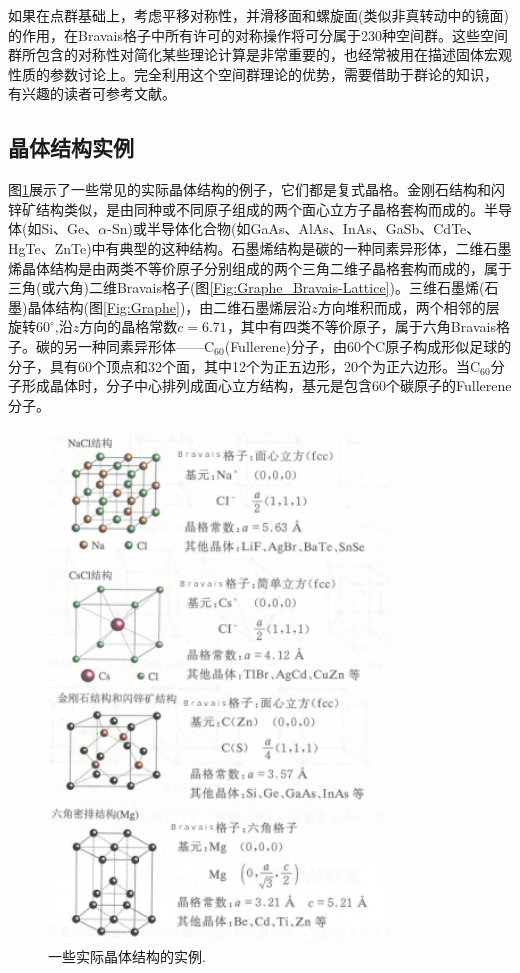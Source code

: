 如果在点群基础上，考虑平移对称性，并滑移面和螺旋面(类似非真转动中的镜面)的作用，在Bravais格子中所有许可的对称操作将可分属于230种空间群。这些空间群所包含的对称性对简化某些理论计算是非常重要的，也经常被用在描述固体宏观性质的参数讨论上。完全利用这个空间群理论的优势，需要借助于群论的知识，%
有兴趣的读者可参考文献。

\subsection{晶体结构实例}
图\ref{Fig:Crystal-structure-example}展示了一些常见的实际晶体结构的例子，它们都是复式晶格。金刚石结构和闪锌矿结构类似，是由同种或不同原子组成的两个面心立方子晶格套构而成的。半导体(如Si、Ge、$\alpha$-Sn)或半导体化合物(如GaAs、AlAs、InAs、GaSb、CdTe、HgTe、ZnTe)中有典型的这种结构。石墨烯结构是碳的一种同素异形体，二维石墨烯晶体结构是由两类不等价原子分别组成的两个三角二维子晶格套构而成的，属于三角(或六角)二维Bravais格子(图\ref{Fig:Graphe_Bravais-Lattice})。三维石墨烯(石墨)晶体结构(图\ref{Fig:Graphe})，由二维石墨烯层沿$z$方向堆积而成，两个相邻的层旋转$60^{\circ}$,沿$z$方向的晶格常数$c=6.71$，其中有四类不等价原子，属于六角Bravais格子。碳的另一种同素异形体——$\mathrm{C}_{60}$(Fullerene)分子，由60个C原子构成形似足球的分子，具有60个顶点和32个面，其中12个为正五边形，20个为正六边形。当$\mathrm{C}_{60}$分子形成晶体时，分子中心排列成面心立方结构，基元是包含60个碳原子的Fullerene分子。
\begin{figure}[h!]
\centering
\vspace*{-0.05in}
\includegraphics[height=5.35in,width=3.55in,viewport=0 0 70 110,clip]{Figures/Crystal_Structure-examples.jpg}
\caption{\small \textrm{一些实际晶体结构的实例.}}%
\label{Fig:Crystal-structure-example}
\end{figure}

